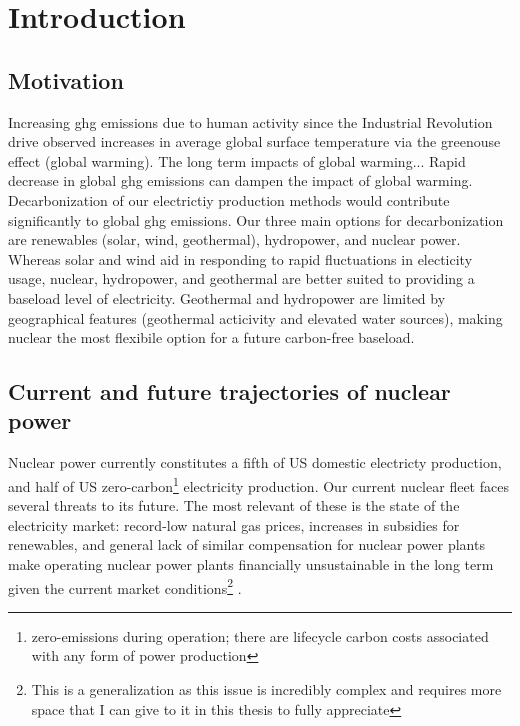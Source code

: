\chapter{Introduction}%
\label{cha:introduction}

\section{Motivation}%
\label{sec:motivation}

Increasing \Gls{ghg} emissions due to human activity since the Industrial Revolution drive observed increases in average global surface temperature via the greenouse effect\cite{mitchell_greenhouse_1989} \cite{paola_a_arias_2021_ts}(global warming).
The long term impacts of global warming...
Rapid decrease in global \Gls{ghg} emissions can dampen the impact of global warming. Decarbonization of our electrictiy production methods would contribute significantly to global \Gls{ghg} emissions. Our three main options for decarbonization are renewables (solar, wind, geothermal), hydropower, and nuclear power. Whereas solar and wind aid in responding to rapid fluctuations in electicity usage, nuclear, hydropower, and geothermal are better suited to
providing a baseload level of electricity. Geothermal and hydropower are limited by geographical features (geothermal acticivity and elevated water sources), making nuclear the most flexibile option for a future carbon-free baseload.

\section{Current and future trajectories of nuclear power}%
\label{sec:current_and_future_trajectories_of_nuclear_power}
Nuclear power currently constitutes a fifth of US domestic electricty production, and half of US zero-carbon\footnote{zero-emissions during operation; there are lifecycle carbon costs associated with any form of power production} electricity production. Our current nuclear fleet faces several threats to its future. The most relevant of these is the state of the electricity market: record-low natural gas prices, increases in subsidies for renewables, and general lack of similar compensation for
nuclear power plants make operating nuclear power plants financially unsustainable in the long term given the current market conditions\footnote{This is a generalization as this issue is incredibly complex and requires more space that I can give to it in this thesis to fully appreciate} \cite{szilard_economic_2016}. %

